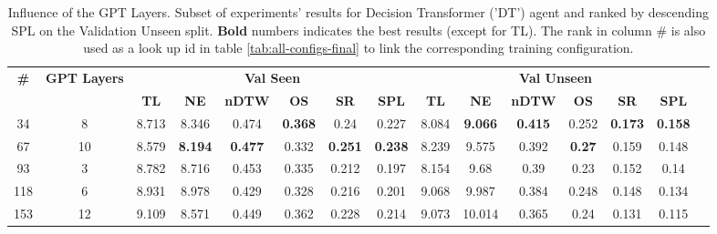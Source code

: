 \begin{table}
\centering
\caption{\label{tab:dt_layers}Influence of the GPT Layers. Subset of experiments' results for Decision Transformer ('DT') agent and ranked by descending SPL on the Validation Unseen split. \textbf{Bold} numbers indicates the best results (except for TL). The rank in column \# is also used as a look up id in table \ref{tab:all-configs-final} to link the corresponding training configuration.}
\begin{tabular}{@{\hskip3pt}c@{\hskip3pt}c@{\hskip3pt}c@{\hskip3pt}c@{\hskip3pt}c@{\hskip3pt}c@{\hskip3pt}c@{\hskip3pt}c@{\hskip3pt}c@{\hskip3pt}c@{\hskip3pt}c@{\hskip3pt}c@{\hskip3pt}c@{\hskip3pt}c@{\hskip3pt}c}
\toprule
                                  \textbf{\#} & \textbf{GPT Layers} & \multicolumn{6}{c}{\textbf{Val Seen}} & \multicolumn{6}{c}{\textbf{Val Unseen}} \\
\cmidrule(l){3-8}\cmidrule(l){9-14}\textbf{~} &          \textbf{~} &       \textbf{TL} &     \textbf{NE} &   \textbf{nDTW} &     \textbf{OS} &     \textbf{SR} &    \textbf{SPL} &         \textbf{TL} &     \textbf{NE} &   \textbf{nDTW} &    \textbf{OS} &     \textbf{SR} &    \textbf{SPL} \\
\midrule
                                           34 &                   8 &             8.713 &           8.346 &           0.474 &  \textbf{0.368} &            0.24 &           0.227 &               8.084 &  \textbf{9.066} &  \textbf{0.415} &          0.252 &  \textbf{0.173} &  \textbf{0.158} \\
                                           67 &                  10 &             8.579 &  \textbf{8.194} &  \textbf{0.477} &           0.332 &  \textbf{0.251} &  \textbf{0.238} &               8.239 &           9.575 &           0.392 &  \textbf{0.27} &           0.159 &           0.148 \\
                                           93 &                   3 &             8.782 &           8.716 &           0.453 &           0.335 &           0.212 &           0.197 &               8.154 &            9.68 &            0.39 &           0.23 &           0.152 &            0.14 \\
                                          118 &                   6 &             8.931 &           8.978 &           0.429 &           0.328 &           0.216 &           0.201 &               9.068 &           9.987 &           0.384 &          0.248 &           0.148 &           0.134 \\
                                          153 &                  12 &             9.109 &           8.571 &           0.449 &           0.362 &           0.228 &           0.214 &               9.073 &          10.014 &           0.365 &           0.24 &           0.131 &           0.115 \\
\bottomrule
\end{tabular}
\end{table}
